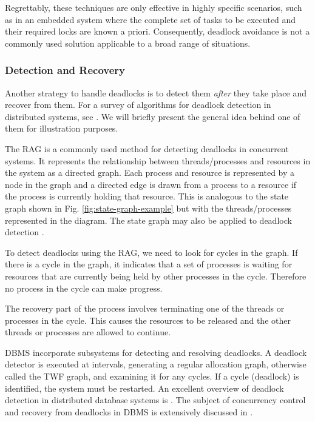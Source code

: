 Regrettably, these techniques are only effective in highly specific scenarios,
such as in an embedded system where the complete set of tasks to be executed
and their required locks are known a priori.
Consequently, deadlock avoidance is not a commonly used solution
applicable to a broad range of situations.

\subsubsection{Detection and Recovery}

Another strategy to handle deadlocks is to detect them
\emph{after} they take place and recover from them.
For a survey of algorithms for deadlock detection
in distributed systems, see \cite{singhal1989deadlock}.
We will briefly present the general idea behind one of them for illustration purposes.

The \acrfull{RAG} is a commonly used method
for detecting deadlocks in concurrent systems.
It represents the relationship between threads/processes
and resources in the system as a directed graph.
Each process and resource is represented by a node in the graph
and a directed edge is drawn from a process to a resource
if the process is currently holding that resource.
This is analogous to the state graph shown in Fig. \ref{fig:state-graph-example}
but with the threads/processes represented in the diagram.
The state graph may also be applied to deadlock detection \cite{coffman1971deadlocks}.

To detect deadlocks using the \acrshort{RAG}, we need to look for cycles in the graph.
If there is a cycle in the graph, it indicates that
a set of processes is waiting for resources
that are currently being held by other processes in the cycle.
Therefore no process in the cycle can make progress.

The recovery part of the process involves
terminating one of the threads or processes in the cycle.
This causes the resources to be released and
the other threads or processes are allowed to continue.

\acrfull{DBMS} incorporate subsystems for detecting and resolving deadlocks.
A deadlock detector is executed at intervals,
generating a regular allocation graph,
otherwise called the \acrfull{TWF} graph,
and examining it for any cycles.
If a cycle (deadlock) is identified, the system must be restarted.
An excellent overview of deadlock detection
in distributed database systems is \cite{knapp1987deadlock}.
The subject of concurrency control and recovery from deadlocks in \acrshort{DBMS} is
extensively discussed in \cite{bernstein1987concurrency}.

